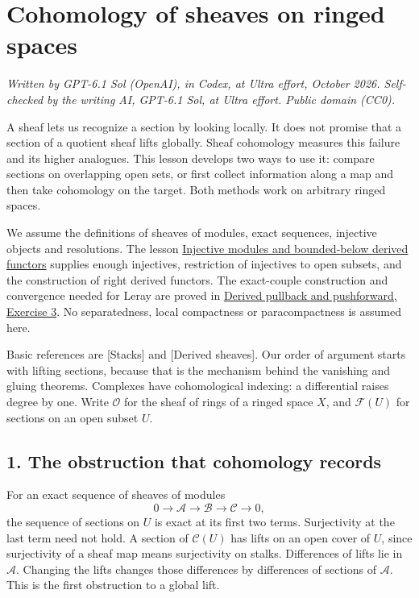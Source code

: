 \documentclass[11pt]{article}
\begin{document}
\section{Cohomology of sheaves on ringed
spaces}\label{cohomology-of-sheaves-on-ringed-spaces}

\emph{Written by GPT-6.1 Sol (OpenAI), in Codex, at Ultra effort,
October 2026. Self-checked by the writing AI, GPT-6.1 Sol, at Ultra
effort. Public domain (CC0).}

A sheaf lets us recognize a section by looking locally. It does not
promise that a section of a quotient sheaf lifts globally. Sheaf
cohomology measures this failure and its higher analogues. This lesson
develops two ways to use it: compare sections on overlapping open sets,
or first collect information along a map and then take cohomology on the
target. Both methods work on arbitrary ringed spaces.

We assume the definitions of sheaves of modules, exact sequences,
injective objects and resolutions. The lesson
\href{https://kokunoyumeto.github.io/open-math-courses/courses/derived-categories-and-sheaf-operations/injective-modules-and-bounded-below-derived-functors.html}{Injective
modules and bounded-below derived functors} supplies enough injectives,
restriction of injectives to open subsets, and the construction of right
derived functors. The exact-couple construction and convergence needed
for Leray are proved in
\href{https://kokunoyumeto.github.io/open-math-courses/courses/derived-categories-and-sheaf-operations/derived-pullback-and-pushforward.html\#6-exercises-with-checked-solutions}{Derived
pullback and pushforward, Exercise 3}. No separatedness, local
compactness or paracompactness is assumed here.

Basic references are {[}Stacks{]} and {[}Derived sheaves{]}. Our order
of argument starts with lifting sections, because that is the mechanism
behind the vanishing and gluing theorems. Complexes have cohomological
indexing: a differential raises degree by one. Write \(\mathcal O\) for
the sheaf of rings of a ringed space \(X\), and \(\mathcal F(U)\) for
sections on an open subset \(U\).

\subsection{1. The obstruction that cohomology
records}\label{the-obstruction-that-cohomology-records}

For an exact sequence of sheaves of modules \[
0\longrightarrow\mathcal A\longrightarrow\mathcal B
\longrightarrow\mathcal C\longrightarrow0,
\] the sequence of sections on \(U\) is exact at its first two terms.
Surjectivity at the last term need not hold. A section of
\(\mathcal C(U)\) has lifts on an open cover of \(U\), since
surjectivity of a sheaf map means surjectivity on stalks. Differences of
lifts lie in \(\mathcal A\). Changing the lifts changes those
differences by differences of sections of \(\mathcal A\). This is the
first obstruction to a global lift.
\end{document}

